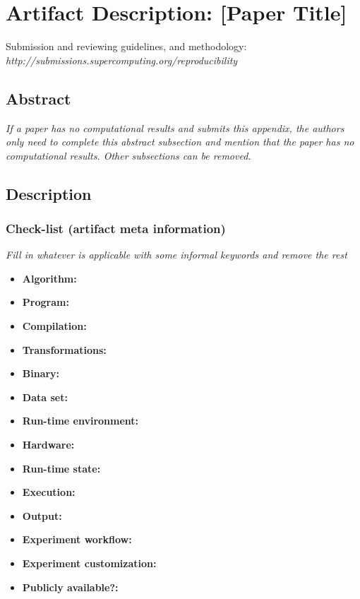 \documentclass{IEEETran}
\begin{document}


\appendix
\section{Artifact Description: [Paper Title]}

Submission and reviewing guidelines, and methodology: \\
{\small\em http://submissions.supercomputing.org/reproducibility}

\subsection{Abstract}

{\em If a paper has no computational results and submits this appendix, the authors only need to complete this abstract subsection and mention that the paper has no computational results.  Other subsections can be removed.}

\subsection{Description}

\subsubsection{Check-list (artifact meta information)}

{\em Fill in whatever is applicable with some informal keywords and remove the rest}

{\small
\begin{itemize}
  \item {\bf Algorithm: }
  \item {\bf Program: }
  \item {\bf Compilation: }
  \item {\bf Transformations: }
  \item {\bf Binary: }
  \item {\bf Data set: }
  \item {\bf Run-time environment: }
  \item {\bf Hardware: }
  \item {\bf Run-time state: }
  \item {\bf Execution: }
  \item {\bf Output: }
  \item {\bf Experiment workflow: }
  \item {\bf Experiment customization: }
  \item {\bf Publicly available?: }
\end{itemize}
}
\end{document}
